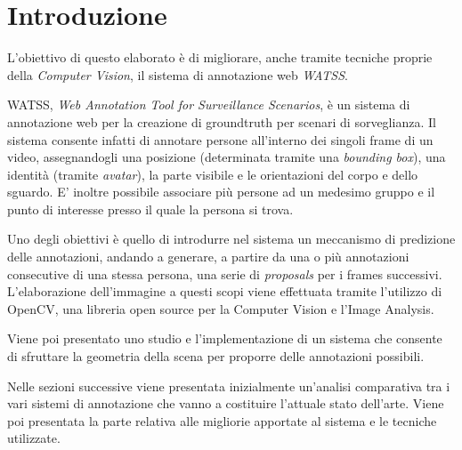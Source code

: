 \section{Introduzione}

L'obiettivo di questo elaborato è di migliorare, anche tramite tecniche proprie della \emph{Computer Vision}, il sistema di annotazione web \emph{WATSS}\cite{Bartoli:2015:WWA:2733373.2807411}.

WATSS, \emph{Web Annotation Tool for Surveillance Scenarios}, è un sistema di annotazione web per la creazione di groundtruth per scenari di sorveglianza. Il sistema consente infatti di annotare persone all'interno dei singoli frame di un video, assegnandogli una posizione (determinata tramite una \emph{bounding box}), una identità (tramite \emph{avatar}), la parte visibile e le orientazioni del corpo e dello sguardo. E' inoltre possibile associare più persone ad un medesimo gruppo e il punto di interesse presso il quale la persona si trova.

Uno degli obiettivi è quello di introdurre nel sistema un meccanismo di predizione delle annotazioni, andando a generare, a partire da una o più annotazioni consecutive di una stessa persona, una serie di \emph{proposals} per i frames successivi. 
L'elaborazione dell'immagine a questi scopi viene effettuata tramite l'utilizzo di OpenCV, una libreria open source per la Computer Vision e l'Image Analysis.

Viene poi presentato uno studio e l'implementazione di un sistema che consente di sfruttare la geometria della scena per proporre delle annotazioni possibili.

Nelle sezioni successive viene presentata inizialmente un'analisi comparativa tra i vari sistemi di annotazione che vanno a costituire l'attuale stato dell'arte. Viene poi presentata la parte relativa alle migliorie apportate al sistema e le tecniche utilizzate. 